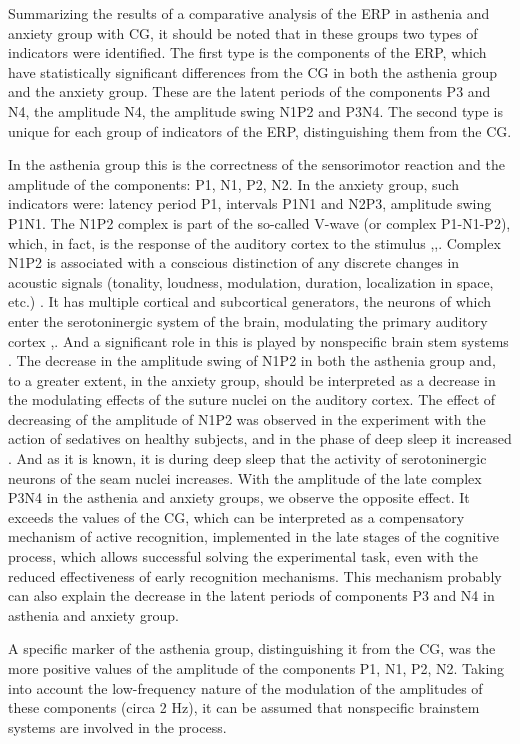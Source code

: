\documentclass[twocolumn]{article}
\begin{document}
\par Summarizing the results of a comparative analysis of the ERP in asthenia and anxiety group with CG, it should be noted that in these groups two types of indicators were identified. The first type is the components of the ERP, which have statistically significant differences from the CG in both the asthenia group and the anxiety group. These are the latent periods of the components P3 and N4, the amplitude N4, the amplitude swing N1P2 and P3N4. The second type is unique for each group of indicators of the ERP, distinguishing them from the CG.
\par In the asthenia group this is the correctness of the sensorimotor reaction and the amplitude of the components: P1, N1, P2, N2. In the anxiety group, such indicators were: latency period P1, intervals P1N1 and N2P3, amplitude swing P1N1. The N1P2 complex is part of the so-called V-wave (or complex P1-N1-P2), which, in fact, is the response of the auditory cortex to the stimulus \cite{bib28},\cite{bib29},\cite{bib30}. Complex N1P2 is associated with a conscious distinction of any discrete changes in acoustic signals (tonality, loudness, modulation, duration, localization in space, etc.) \cite{bib31}. It has multiple cortical and subcortical generators, the neurons of which enter the serotoninergic system of the brain, modulating the primary auditory cortex \cite{bib32},\cite{bib33}. And a significant role in this is played by nonspecific brain stem systems \cite{bib34}. The decrease in the amplitude swing of N1P2 in both the asthenia group and, to a greater extent, in the anxiety group, should be interpreted as a decrease in the modulating effects of the suture nuclei on the auditory cortex. The effect of decreasing of the amplitude of N1P2 was observed in the experiment with the action of sedatives on healthy subjects, and in the phase of deep sleep it increased \cite{bib35}. And as it is known, it is during deep sleep that the activity of serotoninergic neurons of the seam nuclei increases. With the amplitude of the late complex P3N4 in the asthenia and anxiety groups, we observe the opposite effect. It exceeds the values of the CG, which can be interpreted as a compensatory mechanism of active recognition, implemented in the late stages of the cognitive process, which allows successful solving the experimental task, even with the reduced effectiveness of early recognition mechanisms. This mechanism probably can also explain the decrease in the latent periods of components P3 and N4 in asthenia and anxiety group. 
\par A specific marker of the asthenia group, distinguishing it from the CG, was the more positive values of the amplitude of the components P1, N1, P2, N2. Taking into account the low-frequency nature of the modulation of the amplitudes of these components (circa 2 Hz), it can be assumed that nonspecific brainstem systems are involved in the process. 
\end{document}
